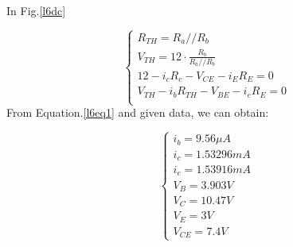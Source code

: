    In Fig.\ref{l6dc}\par
    \begin{equation}
        \begin{cases}
            R_{TH} = R_a//R_b\\
            V_{TH} = 12\cdot\frac{R_b}{R_a//R_b}\\
            12-i_cR_c-V_{CE}-i_ER_E=0\\
            V_{TH}-i_bR_{TH}-V_{BE}-i_eR_E=0\\
        \end{cases}
    \label{l6eq1}
    \end{equation}
    From Equation.\ref{l6eq1} and given data, we can obtain:\par
    \begin{equation*}
        \begin{cases}
            i_b = 9.56\mu A\\
            i_c = 1.53296 mA\\
            i_e = 1.53916 mA\\
            V_B = 3.903 V\\
            V_C = 10.47 V\\
            V_E = 3 V\\
            V_{CE} = 7.4 V
        \end{cases}
    \end{equation*}

